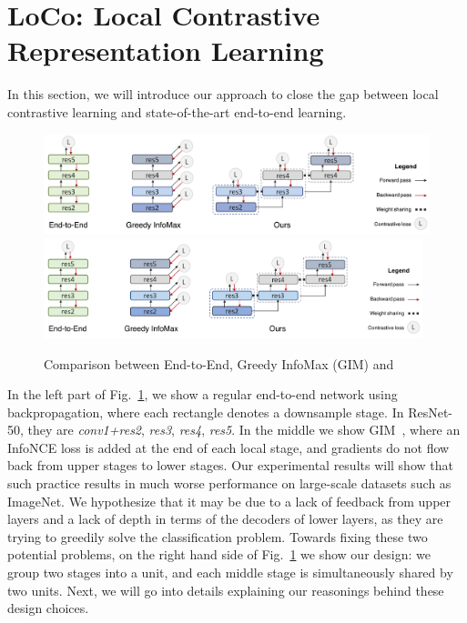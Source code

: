 \section{LoCo: Local Contrastive Representation Learning}
\label{sec:method}
In this section, we will introduce our approach to close the gap between local contrastive learning and state-of-the-art end-to-end learning. 

\begin{figure}[t]
\vspace{-0.2in}
  \centering
  \iflatexml
  \includegraphics[width=6\textwidth,clip]{figures/mainfig_res.png}
  \else
  \includegraphics[width=0.98\textwidth,clip]{figures/mainfig_res.pdf}
  \fi
  \caption{Comparison between End-to-End, Greedy InfoMax (GIM) and {\ours}}
  \label{fig:prev_model}
\vspace{-0.1in}
\end{figure}

In the left part of Fig.~\ref{fig:prev_model}, we show a regular end-to-end network using
backpropagation, where each rectangle denotes a downsample stage. In ResNet-50, they are {\em
conv1+res2}, {\em res3}, {\em res4}, {\em res5}. In the middle we show GIM~\cite{e2e2e}, where an
InfoNCE loss is added at the end of each local stage, and gradients do not flow back from upper
stages to lower stages. Our experimental results will show that such practice results in much worse
performance on large-scale datasets such as ImageNet. We hypothesize that it may be due to a lack of
feedback from upper layers and a lack of depth in terms of the decoders of lower layers, as they are
trying to greedily solve the classification problem. Towards fixing these two potential problems, on
the right hand side of Fig.~\ref{fig:prev_model} we show our design: we group two stages into a
unit, and each middle stage is simultaneously shared by two units. Next, we will go into details
explaining our reasonings behind these  design choices.

